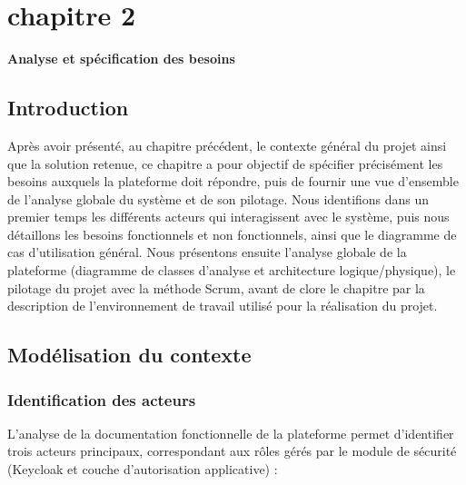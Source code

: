     \chapter*{chapitre 2}
    
    \textbf{\Huge Analyse et spécification des besoins}
    
    \setcounter{chapter}{2}
    \setcounter{section}{0}
    
    
    \section{Introduction}
    
    Après avoir présenté, au chapitre précédent, le contexte général du projet ainsi que la solution retenue, ce chapitre a pour objectif de spécifier précisément les besoins auxquels la plateforme doit répondre, puis de fournir une vue d'ensemble de l'analyse globale du système et de son pilotage. Nous identifions dans un premier temps les différents acteurs qui interagissent avec le système, puis nous détaillons les besoins fonctionnels et non fonctionnels, ainsi que le diagramme de cas d'utilisation général. Nous présentons ensuite l'analyse globale de la plateforme (diagramme de classes d'analyse et architecture logique/physique), le pilotage du projet avec la méthode Scrum, avant de clore le chapitre par la description de l'environnement de travail utilisé pour la réalisation du projet.
    
    
    \section{Modélisation du contexte}
    
    \subsection{Identification des acteurs}
    
    L'analyse de la documentation fonctionnelle de la plateforme permet d'identifier trois acteurs principaux, correspondant aux rôles gérés par le module de sécurité (Keycloak et couche d'autorisation applicative) :
    
